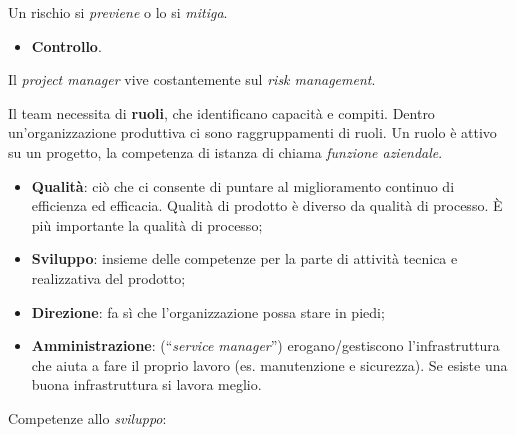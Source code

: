 Un rischio si \textit{previene} o lo si \textit{mitiga}.

\begin{itemize}

	\item \textbf{Controllo}.

\end{itemize}

Il \textit{project manager} vive costantemente sul \textit{risk management}.

Il team necessita di \textbf{ruoli}, che identificano capacità e compiti. Dentro un'organizzazione produttiva ci sono raggruppamenti di ruoli. Un ruolo è attivo su un progetto, la competenza di istanza di chiama \textit{funzione aziendale}.

\begin{itemize}

	\item \textbf{Qualità}: ciò che ci consente di puntare al miglioramento continuo di efficienza ed efficacia. Qualità di prodotto è diverso da qualità di processo. È più importante la qualità di processo;
	
	\item \textbf{Sviluppo}: insieme delle competenze per la parte di attività tecnica e realizzativa del prodotto;
	
	\item \textbf{Direzione}: fa sì che l'organizzazione possa stare in piedi;
	
	\item \textbf{Amministrazione}: (``\textit{service manager}'') erogano/gestiscono l'infrastruttura che aiuta a fare il proprio lavoro (es. manutenzione e sicurezza). Se esiste una buona infrastruttura si lavora meglio.

\end{itemize}

Competenze allo \textit{sviluppo}:

